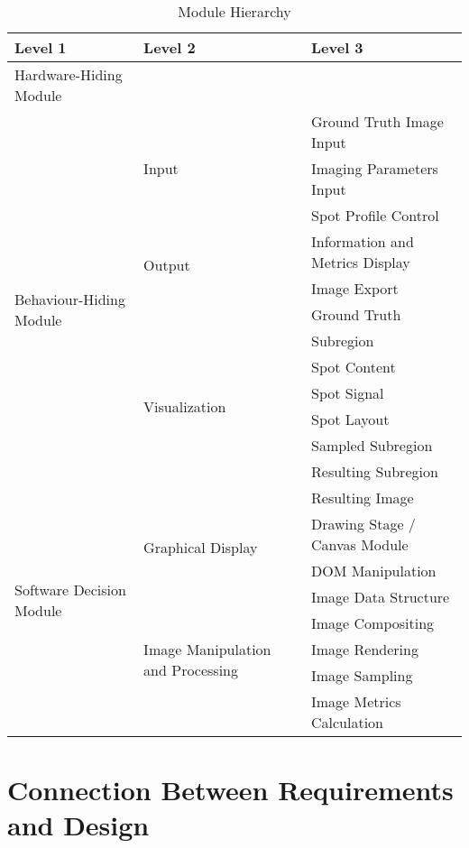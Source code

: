 \documentclass[12pt, titlepage]{article}
\begin{document}
\begin{table}[h!]
\centering
\begin{tabular}{p{} p{} p{}}
\toprule
\textbf{Level 1} & \textbf{Level 2} & \textbf{Level 3}\\
\midrule

{Hardware-Hiding Module} & ~ \\
\midrule

\multirow{13}{0.3\textwidth}{Behaviour-Hiding Module}
& \multirow{3}{0.3\textwidth}{Input}
  & Ground Truth Image Input \\
  && Imaging Parameters Input \\
  && Spot Profile Control \\
  \cline{2-3}
& \multirow{2}{0.3\textwidth}{Output}
  & Information and Metrics Display \\
  && Image Export\\
  \cline{2-3}
& \multirow{8}{0.3\textwidth}{Visualization}
  & Ground Truth \\
  && Subregion \\
  && Spot Content \\
  && Spot Signal \\
  && Spot Layout \\
  && Sampled Subregion \\
  && Resulting Subregion \\
  && Resulting Image \\
\midrule

\multirow{6}{0.3\textwidth}{Software Decision Module}
& \multirow{2}{0.3\textwidth}{Graphical Display}
  & Drawing Stage / Canvas Module \\
  && DOM Manipulation \\
  \cline{2-3}
& \multirow{5}{0.3\textwidth}{Image Manipulation and Processing}
  & Image Data Structure \\
  && Image Compositing \\
  && Image Rendering \\
  && Image Sampling \\
  && Image Metrics Calculation \\
\bottomrule

\end{tabular}
\caption{Module Hierarchy}
\label{TblMH}
\end{table}

\section{Connection Between Requirements and Design} \label{SecConnection}
\end{document}
